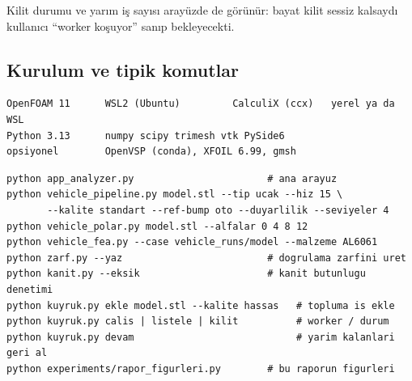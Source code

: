 \documentclass[11pt,a4paper]{article}
\begin{document}
\noindent Kilit durumu ve yarım iş sayısı arayüzde de görünür: bayat kilit
sessiz kalsaydı kullanıcı ``worker koşuyor'' sanıp bekleyecekti.

\subsection*{Kurulum ve tipik komutlar}

\begin{lstlisting}
OpenFOAM 11      WSL2 (Ubuntu)         CalculiX (ccx)   yerel ya da WSL
Python 3.13      numpy scipy trimesh vtk PySide6
opsiyonel        OpenVSP (conda), XFOIL 6.99, gmsh
\end{lstlisting}

\begin{lstlisting}
python app_analyzer.py                       # ana arayuz
python vehicle_pipeline.py model.stl --tip ucak --hiz 15 \
       --kalite standart --ref-bump oto --duyarlilik --seviyeler 4
python vehicle_polar.py model.stl --alfalar 0 4 8 12
python vehicle_fea.py --case vehicle_runs/model --malzeme AL6061
python zarf.py --yaz                         # dogrulama zarfini uret
python kanit.py --eksik                      # kanit butunlugu denetimi
python kuyruk.py ekle model.stl --kalite hassas   # topluma is ekle
python kuyruk.py calis | listele | kilit          # worker / durum
python kuyruk.py devam                            # yarim kalanlari geri al
python experiments/rapor_figurleri.py        # bu raporun figurleri
\end{lstlisting}
\end{document}
